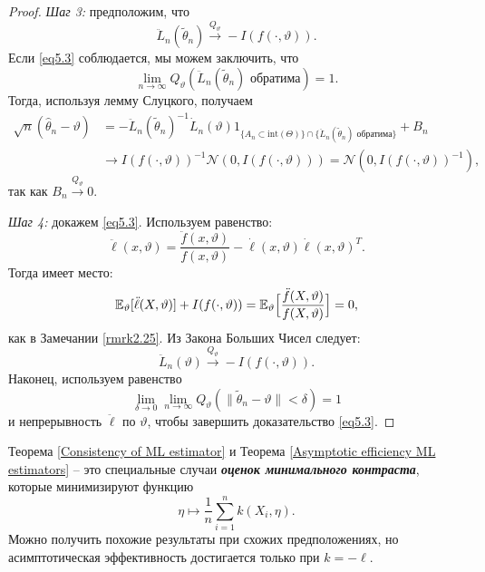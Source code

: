 \begin{proof}
	\textit{Шаг 3:} предположим, что
	\begin{equation} \label{eq5.3}
		\ddot{L}_n(\widetilde{\theta}_n) \xrightarrow{Q_\vartheta} -I(f(\cdot, \vartheta)).
	\end{equation}
	Если \eqref{eq5.3} соблюдается, мы можем заключить, что
	\[ \lim\limits_{n \rightarrow \infty} Q_\vartheta(\ddot{L}_n(\widetilde{\theta}_n) \text{ обратима}) = 1. \]
	Тогда, используя лемму Слуцкого, получаем
	\[
	\begin{aligned}
	\sqrt{n}(\hat{\theta}_n - \vartheta) & = -\ddot{L}_n(\widetilde{\theta}_n)^{-1} \dot{L}_n(\vartheta) 1_{ \{ A_n \subset \mathrm{int}(\Theta)
	 \} \cap \{ \ddot{L}_n(\widetilde{\theta}_n) \text{ обратима} \}} + B_n \\
	& \rightarrow I(f(\cdot, \vartheta))^{-1} \mathcal{N}(0, I(f(\cdot, \vartheta))) = \mathcal{N}(0, I(f(\cdot, \vartheta))^{-1}),
	\end{aligned}
	\]
	так как $B_n \xrightarrow{Q_\vartheta} 0$.
	
	\textit{Шаг 4:} докажем \eqref{eq5.3}. Используем равенство:
	\[ \ddot{\ell}(x, \vartheta) = \frac{\ddot{f}(x, \vartheta)}{f(x,\vartheta)} - \dot{\ell}(x, \vartheta)\dot{\ell}(x, \vartheta)^T. \]
	Тогда имеет место:
	\[\mathbb{E}_\vartheta[\ddot{\ell}(X, \vartheta)] + I(f(\cdot, \vartheta)) = \mathbb{E}_\vartheta\Big[ \frac{\ddot{f}(X, \vartheta)}{f(X,\vartheta)} \Big] = 0, \]
	как в Замечании \ref{rmrk2.25}. Из Закона Больших Чисел следует:
	\[ \ddot{L}_n(\vartheta) \xrightarrow{Q_\vartheta} - I(f(\cdot, \vartheta)). \]
	Наконец, используем равенство
	\[ \lim\limits_{\delta \rightarrow 0} \lim\limits_{n \rightarrow \infty} Q_\vartheta(\| \widetilde{\theta}_n - \vartheta \| < \delta) = 1 \]
	и непрерывность $\ddot{\ell}$ по $\vartheta$, чтобы завершить доказательство \eqref{eq5.3}.
\end{proof}

\begin{rmrk}
	Теорема \ref{Consistency of ML estimator} и Теорема \ref{Asymptotic efficiency ML estimators} -- это специальные случаи \textbf{\textit{оценок минимального контраста}}, которые минимизируют функцию
	\[ \eta \mapsto \frac{1}{n} \sum_{i=1}^{n}k(X_i, \eta). \]
	Можно получить похожие результаты при схожих предположениях, но асимптотическая эффективность достигается только при $k = -\ell$.
\end{rmrk}

